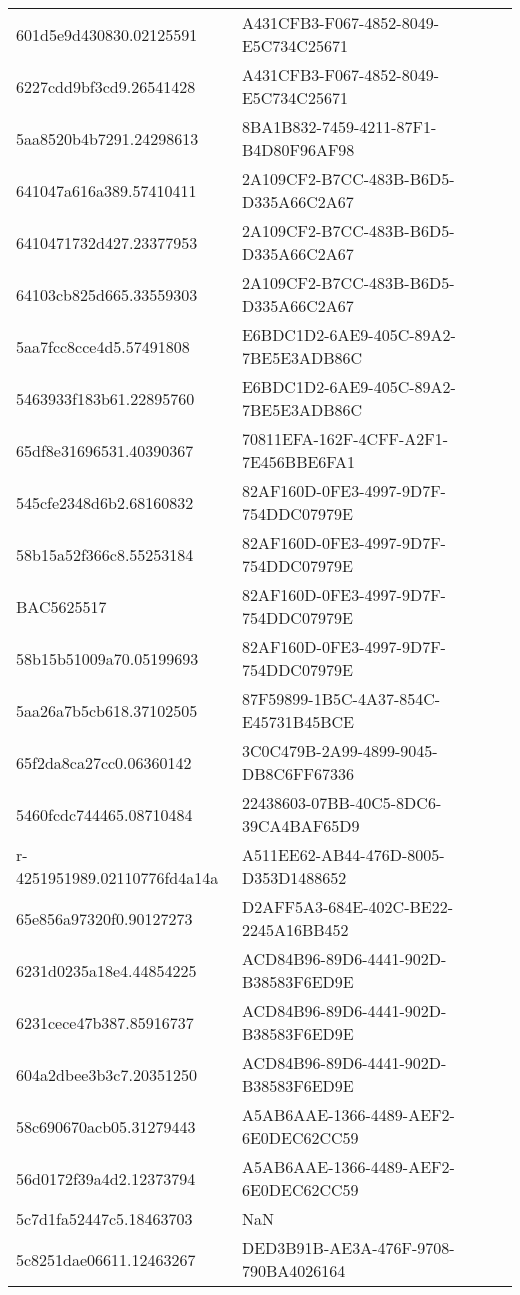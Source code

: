 \begin{tabular}{ll}
601d5e9d430830.02125591 & A431CFB3-F067-4852-8049-E5C734C25671 \\
6227cdd9bf3cd9.26541428 & A431CFB3-F067-4852-8049-E5C734C25671 \\
5aa8520b4b7291.24298613 & 8BA1B832-7459-4211-87F1-B4D80F96AF98 \\
641047a616a389.57410411 & 2A109CF2-B7CC-483B-B6D5-D335A66C2A67 \\
6410471732d427.23377953 & 2A109CF2-B7CC-483B-B6D5-D335A66C2A67 \\
64103cb825d665.33559303 & 2A109CF2-B7CC-483B-B6D5-D335A66C2A67 \\
5aa7fcc8cce4d5.57491808 & E6BDC1D2-6AE9-405C-89A2-7BE5E3ADB86C \\
5463933f183b61.22895760 & E6BDC1D2-6AE9-405C-89A2-7BE5E3ADB86C \\
65df8e31696531.40390367 & 70811EFA-162F-4CFF-A2F1-7E456BBE6FA1 \\
545cfe2348d6b2.68160832 & 82AF160D-0FE3-4997-9D7F-754DDC07979E \\
58b15a52f366c8.55253184 & 82AF160D-0FE3-4997-9D7F-754DDC07979E \\
BAC5625517 & 82AF160D-0FE3-4997-9D7F-754DDC07979E \\
58b15b51009a70.05199693 & 82AF160D-0FE3-4997-9D7F-754DDC07979E \\
5aa26a7b5cb618.37102505 & 87F59899-1B5C-4A37-854C-E45731B45BCE \\
65f2da8ca27cc0.06360142 & 3C0C479B-2A99-4899-9045-DB8C6FF67336 \\
5460fcdc744465.08710484 & 22438603-07BB-40C5-8DC6-39CA4BAF65D9 \\
r-4251951989.02110776fd4a14a & A511EE62-AB44-476D-8005-D353D1488652 \\
65e856a97320f0.90127273 & D2AFF5A3-684E-402C-BE22-2245A16BB452 \\
6231d0235a18e4.44854225 & ACD84B96-89D6-4441-902D-B38583F6ED9E \\
6231cece47b387.85916737 & ACD84B96-89D6-4441-902D-B38583F6ED9E \\
604a2dbee3b3c7.20351250 & ACD84B96-89D6-4441-902D-B38583F6ED9E \\
58c690670acb05.31279443 & A5AB6AAE-1366-4489-AEF2-6E0DEC62CC59 \\
56d0172f39a4d2.12373794 & A5AB6AAE-1366-4489-AEF2-6E0DEC62CC59 \\
5c7d1fa52447c5.18463703 & NaN \\
5c8251dae06611.12463267 & DED3B91B-AE3A-476F-9708-790BA4026164 \\

\end{tabular}
